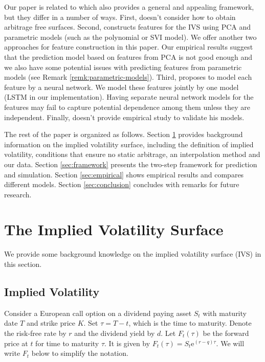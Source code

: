 \documentclass[11pt,a4paper]{article}
\theoremstyle{remark}
\begin{document}
Our paper is related to \cite{bloch2019neural} which also provides a general and appealing framework, but they differ in a number of ways. First, \cite{bloch2019neural} doesn't consider how to obtain arbitrage free surfaces. Second, \cite{bloch2019neural} constructs features for the IVS using PCA and parametric models (such as the polynomial or SVI model). We offer another two approaches for feature construction in this paper. Our empirical results suggest that the prediction model based on features from PCA is not good enough and we also have some potential issues with predicting features from parametric models (see Remark \ref{remk:parametric-models}). Third, \cite{bloch2019neural} proposes to model each feature by a neural network. We model these features jointly by one model (LSTM in our implementation). Having separate neural network models for the features may fail to capture potential dependence among them unless they are independent. Finally, \cite{bloch2019neural} doesn't provide empirical study to validate his models.

The rest of the paper is organized as follows. Section \ref{sec:IVS} provides background information on the implied volatility surface, including the definition of implied volatility, conditions that ensure no static arbitrage, an interpolation method and our data. Section \ref{sec:framework} presents the two-step framework for prediction and simulation. Section \ref{sec:empirical} shows empirical results and compares different models. Section \ref{sec:conclusion} concludes with remarks for future research. 


\section{The Implied Volatility Surface}\label{sec:IVS}

We provide some background knowledge on the implied volatility surface (IVS) in this section. 

\subsection{Implied Volatility}
Consider a European call option on a dividend paying asset $S_{t}$ with maturity date $T$ and strike price $K$. Set $\tau = T-t$, which is the time to maturity. Denote the risk-free rate by $r$ and the dividend yield by $d$. Let $F_t(\tau)$ be the forward price at $t$ for time to maturity $\tau$. It is given by $F_{t}(\tau) = S_{t}\mathrm{e}^{(r-q)\tau}$. We will write $F_t$ below to simplify the notation. 
\end{document}
